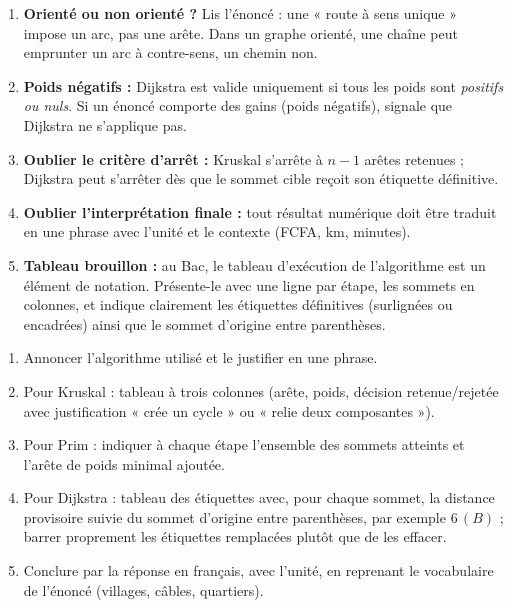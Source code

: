 \documentclass[11pt]{article}
\newcommand{\cle}[1]{{\popxbold\color{popdark}#1}}
\begin{document}
\begin{attention}
\begin{enumerate}
\item \textbf{Orienté ou non orienté ?} Lis l'énoncé : une « route à sens unique » impose un arc, pas une arête. Dans un graphe orienté, une chaîne peut emprunter un arc à contre-sens, un \cle{chemin} non.
\item \textbf{Poids négatifs :} Dijkstra est valide uniquement si tous les poids sont \emph{positifs ou nuls}. Si un énoncé comporte des gains (poids négatifs), signale que Dijkstra ne s'applique pas.
\item \textbf{Oublier le critère d'arrêt :} Kruskal s'arrête à $n-1$ arêtes retenues ; Dijkstra peut s'arrêter dès que le sommet cible reçoit son étiquette définitive.
\item \textbf{Oublier l'interprétation finale :} tout résultat numérique doit être traduit en une phrase avec l'unité et le contexte (FCFA, km, minutes).
\item \textbf{Tableau brouillon :} au Bac, le tableau d'exécution de l'algorithme est un élément de notation. Présente-le avec une ligne par étape, les sommets en colonnes, et indique clairement les étiquettes définitives (surlignées ou encadrées) ainsi que le sommet d'origine entre parenthèses.
\end{enumerate}
\end{attention}

\begin{methode}
\begin{enumerate}
\item Annoncer l'algorithme utilisé et le justifier en une phrase.
\item Pour Kruskal : tableau à trois colonnes (arête, poids, décision retenue/rejetée avec justification « crée un cycle » ou « relie deux composantes »).
\item Pour Prim : indiquer à chaque étape l'ensemble des sommets atteints et l'arête de poids minimal ajoutée.
\item Pour Dijkstra : tableau des étiquettes avec, pour chaque sommet, la distance provisoire suivie du sommet d'origine entre parenthèses, par exemple $6\,(B)$ ; barrer proprement les étiquettes remplacées plutôt que de les effacer.
\item Conclure par la réponse en français, avec l'unité, en reprenant le vocabulaire de l'énoncé (villages, câbles, quartiers).
\end{enumerate}
\end{methode}
\end{document}
